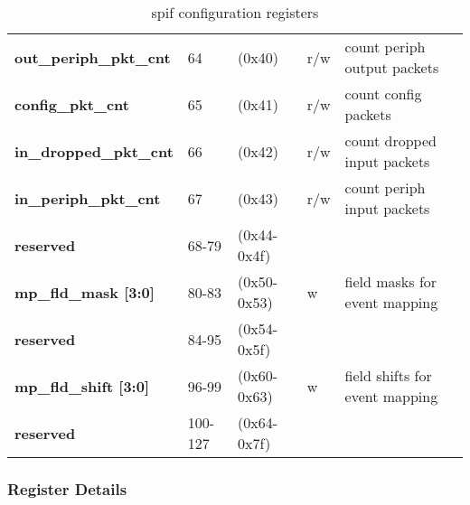 \documentclass[11pt,a4paper,twoside]{article}
\begin{document}
\begin{center}
\begin{table}[!h]
\begin{tabularx}{\textwidth}{| p{34mm} p{13mm} p{21mm} p{7mm} X |}
		\textbf{out\_periph\_pkt\_cnt}       & 64                         & (0x40)                         & r/w                 & count periph output packets\\%
		\textbf{config\_pkt\_cnt}            & 65                         & (0x41)                         & r/w                 & count config packets \\%
		\textbf{in\_dropped\_pkt\_cnt}       & 66                         & (0x42)                         & r/w                 & count dropped input packets \\%
		\textbf{in\_periph\_pkt\_cnt}        & 67                         & (0x43)                         & r/w                 & count periph input packets\\%
		\cellcolor{gray!25}\textbf{reserved} & \cellcolor{gray!25}68-79   & \cellcolor{gray!25}(0x44-0x4f) & \cellcolor{gray!25} & \cellcolor{gray!25}\\%
		\textbf{mp\_fld\_mask [3:0]}         & 80-83                      & (0x50-0x53)                    & w                   & field masks for event mapping \\%
		\cellcolor{gray!25}\textbf{reserved} & \cellcolor{gray!25}84-95   & \cellcolor{gray!25}(0x54-0x5f) & \cellcolor{gray!25} & \cellcolor{gray!25}\\%
		\textbf{mp\_fld\_shift [3:0]}        & 96-99                      & (0x60-0x63)                    & w                   & field shifts for event mapping  \\%
		\cellcolor{gray!25}\textbf{reserved} & \cellcolor{gray!25}100-127 & \cellcolor{gray!25}(0x64-0x7f) & \cellcolor{gray!25} & \cellcolor{gray!25}\\%
		\hline
	\end{tabularx}
	\caption{spif configuration registers}
	\label{tab:spif_regs}
\end{table}
\end{center}


\subsubsection*{Register Details}
\end{document}
